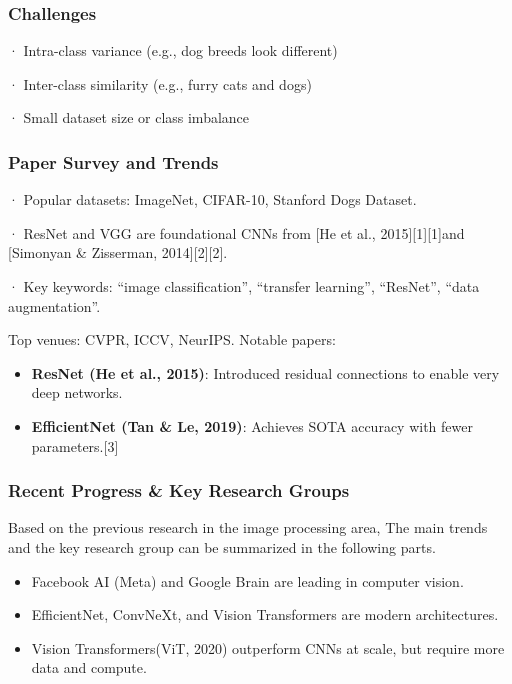 \subsubsection{Challenges}\label{challenges}

· Intra-class variance (e.g., dog breeds look different)

· Inter-class similarity (e.g., furry cats and dogs)

· Small dataset size or class imbalance

\subsubsection{Paper Survey and Trends}\label{paper-survey-and-trends}

· Popular datasets: ImageNet, CIFAR-10, Stanford Dogs Dataset.

· ResNet and VGG are foundational CNNs from {[}He et al.,
2015{]}{[}1{]}{[}1{]}and {[}Simonyan \& Zisserman,
2014{]}{[}2{]}{[}2{]}.

· Key keywords: ``image classification'', ``transfer learning'',
``ResNet'', ``data augmentation''.

Top venues: CVPR, ICCV, NeurIPS. Notable papers:

\begin{itemize}
\tightlist
\item
  \textbf{ResNet (He et al., 2015)}: Introduced residual connections to
  enable very deep networks.
\item
  \textbf{EfficientNet (Tan \& Le, 2019)}: Achieves SOTA accuracy with
  fewer parameters.{[}3{]}
\end{itemize}

\subsubsection{Recent Progress \& Key Research
Groups}\label{recent-progress-key-research-groups}

Based on the previous research in the image processing area, The main
trends and the key research group can be summarized in the following
parts.

\begin{itemize}
\tightlist
\item
  Facebook AI (Meta) and Google Brain are leading in computer vision.
\item
  EfficientNet, ConvNeXt, and Vision Transformers are modern
  architectures.
\item
  Vision Transformers(ViT, 2020) outperform CNNs at scale, but require
  more data and compute.
\end{itemize}

